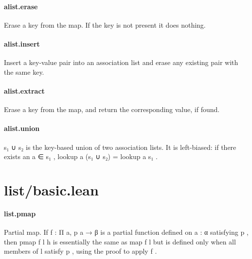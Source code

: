 \documentclass{article}
\begin{document}
\paragraph{alist.erase}
\par
Erase a key from the map. If the key is not present it does nothing.
\paragraph{alist.insert}
\par
Insert a key-value pair into an association list and erase any existing pair
with the same key.
\paragraph{alist.extract}
\par
Erase a key from the map, and return the corresponding value, if found.
\paragraph{alist.union}
\par
\colorbox[RGB]{253,246,227}{{{{\color[RGB]{101, 123, 131} s₁ ∪ s₂ }}}} is the key-based union of two association lists. It is
left-biased: if there exists an 
\colorbox[RGB]{253,246,227}{{{{\color[RGB]{101, 123, 131} a ∈ s₁ }}}}, 
\colorbox[RGB]{253,246,227}{{{{\color[RGB]{101, 123, 131} lookup a (s₁ ∪ s₂)  }}}{{{\color[RGB]{181, 137, 0} = }}}{{{\color[RGB]{101, 123, 131}  lookup a s₁ }}}}.
\section{list/basic.lean}\paragraph{list.pmap}
\par
Partial map. If 
\colorbox[RGB]{253,246,227}{{{{\color[RGB]{101, 123, 131} f : Π a, p a  }}}{{{\color[RGB]{133, 153, 0} → }}}{{{\color[RGB]{101, 123, 131}  β }}}} is a partial function defined on
\colorbox[RGB]{253,246,227}{{{{\color[RGB]{101, 123, 131} a : α }}}} satisfying 
\colorbox[RGB]{253,246,227}{{{{\color[RGB]{101, 123, 131} p }}}}, then 
\colorbox[RGB]{253,246,227}{{{{\color[RGB]{101, 123, 131} pmap f l h }}}} is essentially the same as 
\colorbox[RGB]{253,246,227}{{{{\color[RGB]{101, 123, 131} map f l }}}}but is defined only when all members of 
\colorbox[RGB]{253,246,227}{{{{\color[RGB]{101, 123, 131} l }}}} satisfy 
\colorbox[RGB]{253,246,227}{{{{\color[RGB]{101, 123, 131} p }}}}, using the proof
to apply 
\colorbox[RGB]{253,246,227}{{{{\color[RGB]{101, 123, 131} f }}}}.
\end{document}
